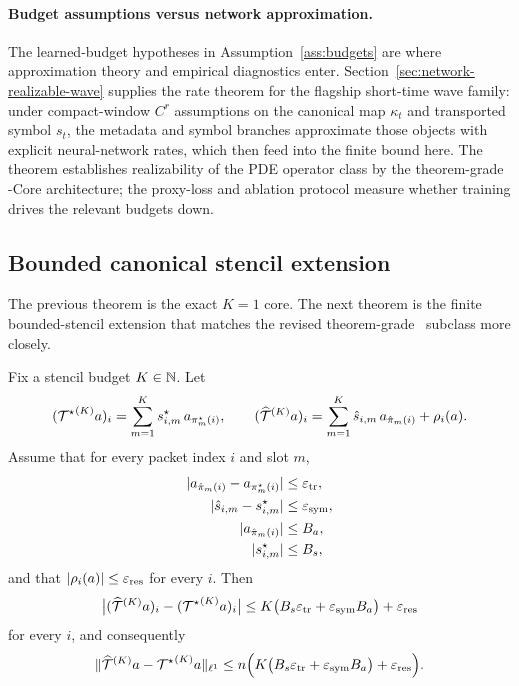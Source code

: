 \paragraph{Budget assumptions versus network approximation.}
The learned-budget hypotheses in Assumption~\ref{ass:budgets} are where approximation theory and empirical diagnostics enter. Section~\ref{sec:network-realizable-wave} supplies the rate theorem for the flagship short-time wave family: under compact-window $C^r$ assumptions on the canonical map $\kappa_t$ and transported symbol $s_t$, the metadata and symbol branches approximate those objects with explicit neural-network rates, which then feed into the finite bound here. The theorem establishes realizability of the PDE operator class by the theorem-grade \MiNO-Core architecture; the proxy-loss and ablation protocol measure whether training drives the relevant budgets down.

\subsection{Bounded canonical stencil extension}

The previous theorem is the exact $K=1$ core. The next theorem is the finite bounded-stencil extension that matches the revised theorem-grade \MiNO\ subclass more closely.

\begin{theorem}
\label{thm:stencil-propagation}
Fix a stencil budget $K\in\mathbb N$. Let
\[
({\mathcal T^\star}^{(K)} a)_i
=
\sum_{m=1}^{K} s^\star_{i,m}\, a_{\pi^\star_m(i)},
\qquad
({\widehat{\mathcal T}}^{(K)} a)_i
=
\sum_{m=1}^{K} \hat s_{i,m}\, a_{\hat\pi_m(i)} + \rho_i(a).
\]
Assume that for every packet index $i$ and slot $m$,
\begin{align*}
|a_{\hat\pi_m(i)}-a_{\pi_m^\star(i)}| &\le \varepsilon_{\mathrm{tr}},\\
|\hat s_{i,m}-s^\star_{i,m}| &\le \varepsilon_{\mathrm{sym}},\\
|a_{\hat\pi_m(i)}| &\le B_a,\\
|s^\star_{i,m}| &\le B_s,
\end{align*}
and that $|\rho_i(a)|\le \varepsilon_{\mathrm{res}}$ for every $i$. Then
\[
\bigl|({\widehat{\mathcal T}}^{(K)}a)_i-({\mathcal T^\star}^{(K)}a)_i\bigr|
\le
K\bigl(B_s\varepsilon_{\mathrm{tr}}+\varepsilon_{\mathrm{sym}}B_a\bigr)+\varepsilon_{\mathrm{res}}
\]
for every $i$, and consequently
\[
\|{\widehat{\mathcal T}}^{(K)}a-{\mathcal T^\star}^{(K)}a\|_{\ell^1}
\le
n\Bigl(K\bigl(B_s\varepsilon_{\mathrm{tr}}+\varepsilon_{\mathrm{sym}}B_a\bigr)+\varepsilon_{\mathrm{res}}\Bigr).
\]
\end{theorem}

